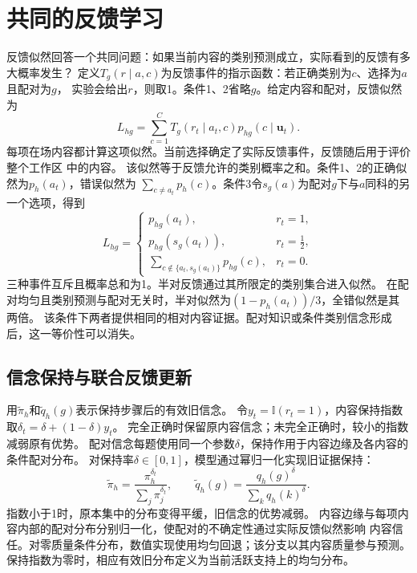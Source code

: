 \documentclass[11pt,a4paper]{article}
\numberwithin{equation}{section}
\newcommand{\ind}{\mathbb{I}}
\begin{document}
\section{共同的反馈学习}
\label{sec:feedback}

反馈似然回答一个共同问题：如果当前内容的类别预测成立，实际看到的反馈有多大概率发生？
定义$T_g(r\mid a,c)$为反馈事件的指示函数：若正确类别为$c$、选择为$a$且配对为$g$，
实验会给出$r$，则取1。条件1、2省略$g$。给定内容和配对，反馈似然为
\begin{equation}
L_{hg}=\sum_{c=1}^C T_g(r_t\mid a_t,c)p_{hg}(c\mid\bm u_t).
\label{eq:feedback-likelihood}
\end{equation}
每项在场内容都计算这项似然。当前选择确定了实际反馈事件，反馈随后用于评价整个工作区
中的内容。
该似然等于反馈允许的类别概率之和。条件1、2的正确似然为$p_h(a_t)$，错误似然为
$\sum_{c\ne a_t}p_h(c)$。条件3令$s_g(a)$为配对$g$下与$a$同科的另一个选项，得到
\begin{equation}
L_{hg}=\begin{cases}
p_{hg}(a_t),&r_t=1,\\
p_{hg}(s_g(a_t)),&r_t=\tfrac12,\\
\displaystyle\sum_{c\notin\{a_t,s_g(a_t)\}}p_{hg}(c),&r_t=0.
\end{cases}
\label{eq:ternary-feedback}
\end{equation}
三种事件互斥且概率总和为1。半对反馈通过其所限定的类别集合进入似然。
在配对均匀且类别预测与配对无关时，半对似然为$(1-p_h(a_t))/3$，全错似然是其两倍。
该条件下两者提供相同的相对内容证据。配对知识或条件类别信念形成后，这一等价性可以消失。

\subsection{信念保持与联合反馈更新}
用$\widetilde\pi_h$和$\widetilde q_h(g)$表示保持步骤后的有效旧信念。
令$y_t=\ind(r_t=1)$，内容保持指数取$\delta_t=\delta+(1-\delta)y_t$。
完全正确时保留原内容信念；未完全正确时，较小的指数减弱原有优势。
配对信念每题使用同一个参数$\delta$，保持作用于内容边缘及各内容的条件配对分布。
对保持率$\delta\in[0,1]$，模型通过幂归一化实现旧证据保持：
\begin{equation}
\widetilde\pi_h=\frac{\pi_h^{\delta_t}}{\sum_j\pi_j^{\delta_t}},\qquad
\widetilde q_h(g)=\frac{q_h(g)^\delta}{\sum_kq_h(k)^\delta}.
\label{eq:retention}
\end{equation}
指数小于1时，原本集中的分布变得平缓，旧信念的优势减弱。
内容边缘与每项内容内部的配对分布分别归一化，使配对的不确定性通过实际反馈似然影响
内容信任。对零质量条件分布，数值实现使用均匀回退；该分支以其内容质量参与预测。
保持指数为零时，相应有效旧分布定义为当前活跃支持上的均匀分布。
\end{document}
